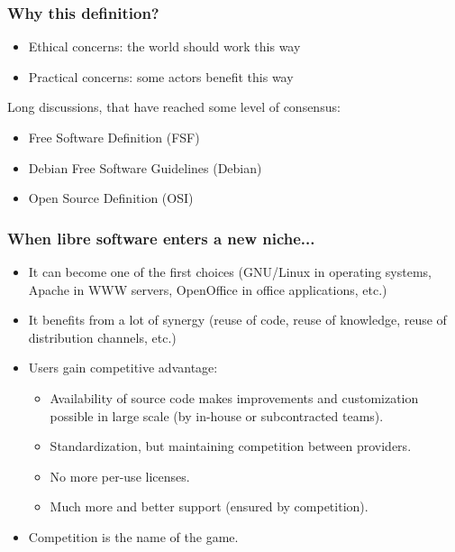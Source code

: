 
\begin{frame}
\frametitle{Why this definition?}

\begin{itemize}
\item Ethical concerns: the world should work this way
\item Practical concerns: some actors benefit this way
\end{itemize}

Long discussions, that have reached some level of consensus:

\begin{itemize}
\item Free Software Definition (FSF)
\item Debian Free Software Guidelines (Debian)
\item Open Source Definition (OSI)
\end{itemize}

\end{frame}



\begin{frame}
\frametitle{When libre software enters a new niche...}

\begin{itemize}
\item It can become one of the first choices (GNU/Linux in operating
  systems, Apache in WWW servers, OpenOffice in office applications, etc.)
\item It benefits from a lot of synergy (reuse of code, reuse of
  knowledge, reuse of distribution channels, etc.)
\item Users gain competitive advantage:
  \begin{itemize}
  \item Availability of source code makes improvements and
    customization possible in large scale (by in-house or
    subcontracted teams).
  \item Standardization, but maintaining competition between
    providers.
  \item No more per-use licenses.
  \item Much more and better support (ensured by competition).
  \end{itemize}
\item Competition is the name of the game.
\end{itemize}

\end{frame}



